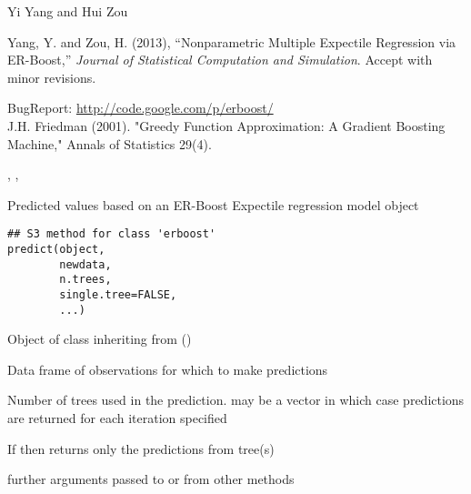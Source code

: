 \documentclass[a4paper]{book}
\begin{document}
%
\begin{Author}\relax
Yi Yang  and Hui Zou 
\end{Author}
%
\begin{References}\relax
Yang, Y. and Zou, H. (2013), ``Nonparametric Multiple Expectile Regression via ER-Boost,'' \emph{Journal of Statistical Computation and Simulation}. Accept with minor revisions.

BugReport: \url{http://code.google.com/p/erboost/}\\{}
J.H. Friedman (2001). "Greedy Function Approximation: A Gradient Boosting
Machine," Annals of Statistics 29(4).
\end{References}
%
\begin{SeeAlso}\relax
 , ,  
\end{SeeAlso}
%
\begin{Description}\relax
Predicted values based on an ER-Boost Expectile regression model object
\end{Description}
%
\begin{Usage}
\begin{verbatim}
## S3 method for class 'erboost'
predict(object,
        newdata,
        n.trees,
        single.tree=FALSE,
        ...)
\end{verbatim}
\end{Usage}
%
\begin{Arguments}
\begin{ldescription}
\item[\code{object}]  Object of class inheriting from () 
\item[\code{newdata}]  Data frame of observations for which to make predictions 
\item[\code{n.trees}]  Number of trees used in the prediction.  may
be a vector in which case predictions are returned for each
iteration specified
\item[\code{single.tree}] If  then  returns
only the predictions from tree(s) 
\item[\code{...}]  further arguments passed to or from other methods 
\end{ldescription}
\end{Arguments}
\end{document}
